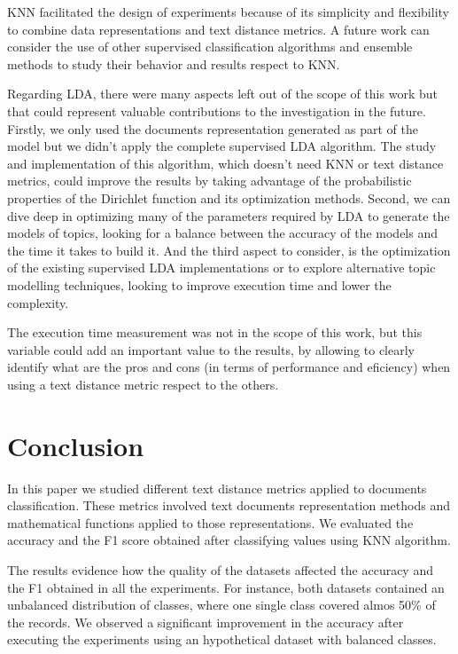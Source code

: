 \documentclass[preprint,12pt,3p]{elsarticle}
\begin{document}
KNN facilitated the design of experiments because of its simplicity and flexibility to combine data representations and text distance metrics. A future work can consider the use of other supervised classification algorithms and ensemble methods to study their behavior and results respect to KNN.\par

Regarding LDA, there were many aspects left out of the scope of this work but that could represent valuable contributions to the investigation in the future. Firstly, we only used the documents representation generated as part of the model but we didn't apply the complete supervised LDA algorithm. The study and implementation of this algorithm, which doesn't need KNN or text distance metrics, could improve the results by taking advantage of the probabilistic properties of the Dirichlet function and its optimization methods. Second, we can dive deep in optimizing many of the parameters required by LDA to generate the models of topics, looking for a balance between the accuracy of the models and the time it takes to build it. And the third aspect to consider, is the optimization of the existing supervised LDA implementations or to explore alternative topic modelling techniques, looking to improve execution time and lower the complexity.\par

The execution time measurement was not in the scope of this work, but this variable could add an important value to the results, by allowing to clearly identify what are the pros and cons (in terms of performance and eficiency) when using a text distance metric respect to the others.\par

\section{Conclusion}
\label{conclusion}

In this paper we studied different text distance metrics applied to documents classification. These metrics involved text documents representation methods and mathematical functions applied to those representations. We evaluated the accuracy and the F1 score obtained after classifying values using KNN algorithm.\par

The results evidence how the quality of the datasets affected the accuracy and the F1 obtained in all the experiments. For instance, both datasets contained an unbalanced distribution of classes, where one single class covered almos 50\% of the records. We observed a significant improvement in the accuracy after executing the experiments using an hypothetical dataset with balanced classes.\par
\end{document}
